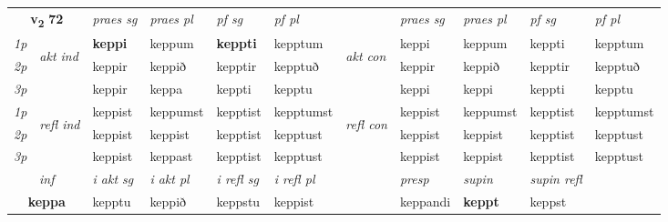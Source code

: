 \noindent
\begin{tabular}{lllllllllll} \toprule
\multicolumn{2}{c}{\textbf{v{\textsubscript{2}}} \Large{\textbf{72}}}  &  \textit{praes sg}  & \textit{praes pl}  &\textit{ pf sg} & \textit{pf pl} &  &  \textit{praes sg}  & \textit{praes pl}  & \textit{pf sg} & \textit{pf pl } \\*
	\cmidrule{3-6} \cmidrule{8-11}
 {\textit{1p}} & \multirow{3}{*}{\begin{turn}{90}\textit{akt ind}\end{turn}} & \textbf{keppi} & keppum & \textbf{keppti} & kepptum & \multirow{3}{*}{\begin{turn}{90}\textit{akt con}\end{turn}} &keppi & keppum & keppti & kepptum\\*
 {\textit{2p}} &  &  keppir  & keppið & kepptir & kepptuð & & keppir & keppið & kepptir & kepptuð \\*
{\textit{3p}} &  & keppir & keppa & keppti & kepptu & & keppi & keppi& keppti & kepptu \\*
\cmidrule{3-6} \cmidrule{8-11}
 {\textit{1p}} & \multirow{3}{*}{\begin{turn}{90}\textit{refl ind}\end{turn}}  & keppist & keppumst & kepptist & kepptumst & \multirow{3}{*}{\begin{turn}{90}\textit{refl con}\end{turn}}  &keppist & keppumst & kepptist & kepptumst \\*
 {\textit{2p}} &  & keppist & keppist & kepptist & kepptust & &keppist & keppist & kepptist & kepptust \\*
 {\textit{3p}}  & & keppist & keppast & kepptist & kepptust & & keppist & keppist& kepptist & kepptust \\*
\cmidrule{3-6} \cmidrule{8-11}

   \multicolumn{2}{c}{\textit{inf}}  & \textit{i akt sg} & \textit{i akt pl} & \textit{i refl sg} & \textit{i refl pl} && \textit{presp} & \textit{supin} & \textit{supin refl}  \\*
  \multicolumn{2}{c}{\textbf{keppa}} & kepptu  & keppið & keppstu & keppist && keppandi &  \textbf{keppt} & keppst  \\*
\end{tabular}

